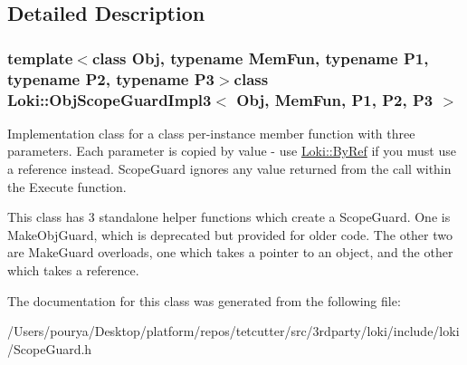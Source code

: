 \subsection{Detailed Description}
\subsubsection*{template$<$class Obj, typename Mem\+Fun, typename P1, typename P2, typename P3$>$class Loki\+::\+Obj\+Scope\+Guard\+Impl3$<$ Obj, Mem\+Fun, P1, P2, P3 $>$}

Implementation class for a class per-\/instance member function with three parameters. Each parameter is copied by value -\/ use \hyperlink{group__ExceptionGroup_ga0a94ba0342e6abcdb8f9b32ed5ad7e3d}{Loki\+::\+By\+Ref} if you must use a reference instead. Scope\+Guard ignores any value returned from the call within the Execute function.

This class has 3 standalone helper functions which create a Scope\+Guard. One is Make\+Obj\+Guard, which is deprecated but provided for older code. The other two are Make\+Guard overloads, one which takes a pointer to an object, and the other which takes a reference. 

The documentation for this class was generated from the following file\+:\begin{DoxyCompactItemize}
\item 
/\+Users/pourya/\+Desktop/platform/repos/tetcutter/src/3rdparty/loki/include/loki/Scope\+Guard.\+h\end{DoxyCompactItemize}
